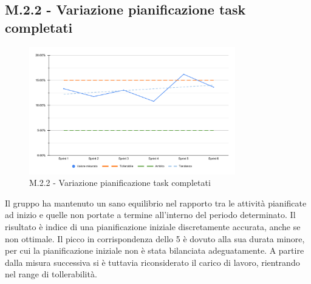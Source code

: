 \subsection{M.2.2 - Variazione pianificazione task completati}
\begin{figure}[H]
    \centering
    \includegraphics[width=0.8\textwidth]{assets/variazione_task_completati.pdf}
    \caption{M.2.2 - Variazione pianificazione task completati}
\end{figure}

\par Il gruppo ha mantenuto un sano equilibrio nel rapporto tra le attività pianificate ad inizio  e quelle non portate a termine all'interno del periodo determinato. Il risultato è indice di una pianificazione iniziale discretamente accurata, anche se non ottimale. Il picco in corrispondenza dello  5 è dovuto alla sua durata minore, per cui la pianificazione iniziale non è stata bilanciata adeguatamente. A partire dalla misura successiva si è tuttavia riconsiderato il carico di lavoro, rientrando nel range di tollerabilità.